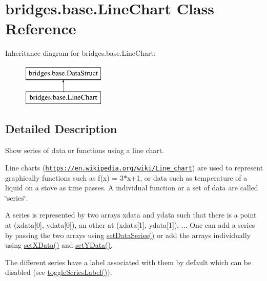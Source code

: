 \hypertarget{classbridges_1_1base_1_1_line_chart}{}\section{bridges.\+base.\+Line\+Chart Class Reference}
\label{classbridges_1_1base_1_1_line_chart}
Inheritance diagram for bridges.\+base.\+Line\+Chart\+:\begin{figure}[H]
\begin{center}
\leavevmode
\includegraphics[height=2.000000cm]{classbridges_1_1base_1_1_line_chart}
\end{center}
\end{figure}


\subsection{Detailed Description}
Show series of data or functions using a line chart. 

Line charts (\href{https://en.wikipedia.org/wiki/Line_chart}{\tt https\+://en.\+wikipedia.\+org/wiki/\+Line\+\_\+chart}) are used to represent graphically functions such as f(x) = 3$\ast$x+1, or data such as temperature of a liquid on a stove as time passes. A individual function or a set of data are called \char`\"{}series\char`\"{}.

A series is represented by two arrays xdata and ydata such that there is a point at (xdata\mbox{[}0\mbox{]}, ydata\mbox{[}0\mbox{]}), an other at (xdata\mbox{[}1\mbox{]}, ydata\mbox{[}1\mbox{]}), ... One can add a series by passing the two arrays using \mbox{\hyperlink{classbridges_1_1base_1_1_line_chart_a586e9953b13e51ab9e592acfb034887b}{set\+Data\+Series()}} or add the arrays individually using \mbox{\hyperlink{classbridges_1_1base_1_1_line_chart_a2918179283e8280d47abb43df3c59195}{set\+X\+Data()}} and \mbox{\hyperlink{classbridges_1_1base_1_1_line_chart_a3076dc99debb599529169de40815aba2}{set\+Y\+Data()}}.

The different series have a label associated with them by default which can be disabled (see \mbox{\hyperlink{classbridges_1_1base_1_1_line_chart_adae74cfb09585727a96cf74ddf74d098}{toggle\+Series\+Label()}}).


